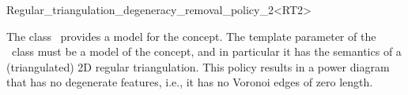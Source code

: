 

\begin{ccRefClass}{Regular_triangulation_degeneracy_removal_policy_2<RT2>}


\ccDefinition

The class \ccRefName\ provides a model for the 
concept. The template parameter of the \ccRefName\ class must be a
model of the  concept, and in particular it has
the semantics of a (triangulated) 2D regular triangulation. This policy
results in a power diagram that has no degenerate features,
i.e., it has no Voronoi edges of zero length.



\ccIsModel
{}

\ccTypes
{}

\ccSeeAlso
{}\\
\\
\\
\\
\end{ccRefClass}



